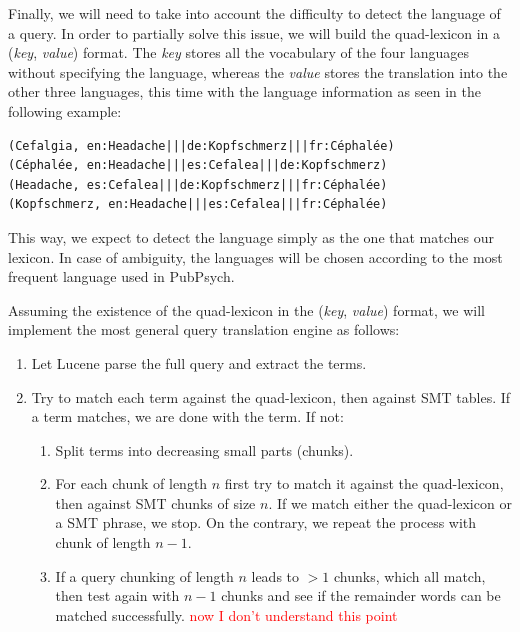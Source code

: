 \documentclass[a4paper,11pt]{article}
\newcommand{\red}[1]{\textcolor{red}{#1}}
\begin{document}
Finally, we will need to take into account the difficulty to detect the language of a query. In order to partially solve this issue, we will build the quad-lexicon in a (\emph{key}, \emph{value}) format. The \emph{key} stores all the vocabulary of the four languages without specifying the language, whereas the \emph{value} stores the translation into the other three languages, this time with the language information as seen in the following example:
{\small
\begin{verbatim}
(Cefalgia, en:Headache|||de:Kopfschmerz|||fr:Céphalée)
(Céphalée, en:Headache|||es:Cefalea|||de:Kopfschmerz)
(Headache, es:Cefalea|||de:Kopfschmerz|||fr:Céphalée)
(Kopfschmerz, en:Headache|||es:Cefalea|||fr:Céphalée)
\end{verbatim}
}

\noindent This way, we expect to detect the language simply as the one that matches our lexicon. In case of ambiguity, the languages will be chosen according to the most frequent language used in PubPsych.

Assuming the existence of the quad-lexicon in the (\emph{key}, \emph{value}) format, we will implement the most general query translation engine as follows:

\begin{enumerate}
 \item Let Lucene parse the full query and extract the terms.
 \item Try to match each term against the quad-lexicon, then against SMT tables. If a term matches, we are done with the term. If not:
 \begin{enumerate}[label*=\arabic*.]
 \item Split terms into decreasing small parts (chunks).
 \item For each chunk of length $n$ first try to match it against the quad-lexicon, then against SMT chunks of size $n$. If we match either the quad-lexicon or a SMT phrase, we stop. On the contrary, we repeat the process with chunk of length $n-1$.
 \item If a query chunking of length $n$ leads to $>1$ chunks, which all match, then test again with $n-1$ chunks and see if the remainder words can be matched successfully. \red{now I don't understand this point}
 \end{enumerate}
\end{enumerate}
\end{document}

